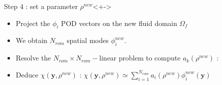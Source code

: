 \begin{frame}%
%
\begin{block}{Step 4 : set a parameter $\rho^{new}$}<+->
\begin{itemize}
\item<+-> Project the $\phi_i$ POD vectors on the new fluid domain $\Omega_f$
\item<+-> We obtain $N_{rom}$ spatial modes $\phi_i^{new}$.
\item<+-> Resolve the $N_{rom}\times N_{rom}-$linear problem to compute $a_k(\rho^{new})$ :
\end{itemize}
\begin{itemize}
\item<+-> Deduce $\chi(\mathbf{y},\rho^{new})$ : $\chi\left(\mathbf{y},\rho^{new}\right)\simeq \sum\limits_{i=1}^{N_{rom}} a_i \left(\rho^{new}\right)\phi_i^{new}(\mathbf{y})$
\end{itemize}
\end{block}
%
\end{frame}
